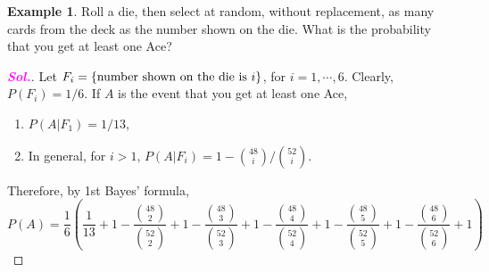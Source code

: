 \documentclass[12pt,a4paper]{article}
\theoremstyle{definition}
\newtheorem{example}{Example}[section]
\theoremstyle{definition}
\theoremstyle{definition}
\theoremstyle{definition}
\theoremstyle{remark}
\theoremstyle{definition}
\newcommand{\sol}{\textcolor{magenta}{\bf \textit{Sol.}}\quad}
\begin{document}
\begin{example}
	Roll a die, then select at random, without replacement, as many cards from the deck as the number shown on the die. What is the probability that you get at least one Ace?\begin{proof}[\sol]
		Let $F_i=\set{\text{number shown on the die is}\ i}$, for $i=1,\cdots,6$. Clearly, $P(F_i)=1/6$. If $A$ is the event that you get at least one Ace, \begin{enumerate}
			\item $P(A|F_1)=1/13$,
			\item In general, for $i>1$, $P(A|F_i)=1-\binom{48}{i}/\binom{52}{i}$.
		\end{enumerate} Therefore, by 1st Bayes' formula, \[
	P(A)=\frac{1}{6}\left(\frac{1}{13}+1-\frac{\binom{48}{2}}{\binom{52}{2}}+1-\frac{\binom{48}{3}}{\binom{52}{3}}+1-\frac{\binom{48}{4}}{\binom{52}{4}}+1-\frac{\binom{48}{5}}{\binom{52}{5}}+1-\frac{\binom{48}{6}}{\binom{52}{6}}+1\right)
	\]
	\end{proof}
\end{example}
\
\end{document}

